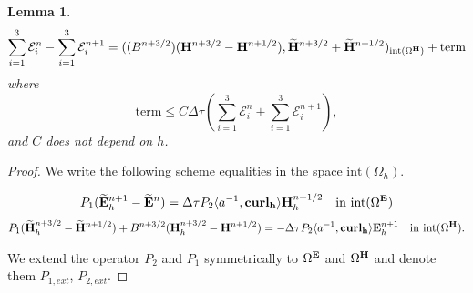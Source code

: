 \documentclass[12pt,reqno]{amsart}
\newcommand{\acurl}{\langle a^{-1},{\bf curl_h}\rangle}
\newcommand{\e}{{\bf E}}
\newcommand{\h}{{\bf H}}
\newtheorem{lem}[theorem]{Lemma}
\theoremstyle{definition}
\numberwithin{equation}{section}
\newcommand{\intr}[1]{\mathrm{int}(#1)}
\def\Gw{\Omega}     \def\Gx{\Xi}         \def\Gy{\Psi}
\def\Gwh{\Omega_h}
\begin{document}
\begin{lem}
$$\sum_{i=1}^3\mathcal{E}_i^n-
\sum_{i=1}^3\mathcal{E}_i^{n+1}=
((B^{n+3/2})(\h^{n+3/2}-\h^{n+1/2}),\widetilde{\h}^{n+3/2}+\widetilde{\h}^{n+1/2})_{\intr{\Gw^\h}}+\mathrm{term}
$$
where 
$$
\mathrm{term}\leq C \Delta \tau( \sum_{i=1}^3\mathcal{E}_i^n+
\sum_{i=1}^3\mathcal{E}_i^{n+1}),
$$
and $C$ does not depend on $h$.

\end{lem}
\begin{proof}

We write the following scheme equalities in the space $\intr\Gwh$.
	
	\begin{align}
	P_1(\widetilde{\e}_h^{n+1} -\widetilde{\e}^{n})=
		\Delta \tau P_2 \acurl \h_h^{n+1/2} \quad \mathrm{in} \  \intr{\Gw^\e}
	\end{align}
		\begin{align}
			P_1(\widetilde{\h}_h^{n+3/2} -\widetilde{\h}^{n+1/2})+
			B^{n+3/2}(\h_h^{n+3/2} -\h^{n+1/2})
=
			-\Delta \tau P_2 \acurl \e_h^{n+1}  \quad \mathrm{in} \  \intr{\Gw^\h}.
	\end{align}

  We extend the operator $P_2$ and $P_1$ symmetrically  to $\Gw^{\e}$ and 
  $\Gw^{\h}$ and denote them $P_{1,ext}$, $P_{2,ext}$.
  

\end{proof}
\end{document}
